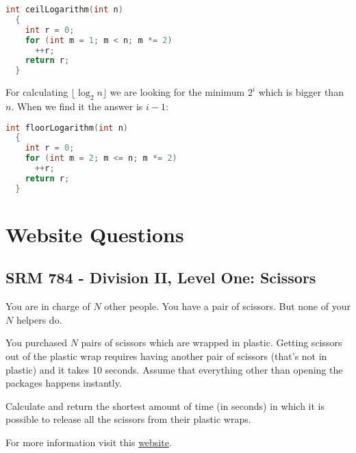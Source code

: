 \documentclass{book}
\begin{document}
	\begin{lstlisting}[language=C++, frame=single]
  int ceilLogarithm(int n)
  {
    int r = 0;    
    for (int m = 1; m < n; m *= 2)
      ++r;
    return r;
  }
	\end{lstlisting}
	For calculating $\lfloor \log_2{n} \rfloor$ we are looking for the minimum $2^i$ which is bigger than $n$. When we find it the answer is $i - 1$:
	\begin{lstlisting}[language=C++, frame=single]
  int floorLogarithm(int n)
  {
    int r = 0;    
    for (int m = 2; m <= n; m *= 2)
      ++r;
    return r;
  }
	\end{lstlisting}
	\section{Website Questions}
	\subsection{SRM 784 - Division II, Level One: Scissors}
	You are in charge of $N$ other people. You have a pair of scissors. But none of your $N$ helpers do. 
	\par You purchased $N$ pairs of scissors which are wrapped in plastic. Getting scissors out of the plastic wrap requires having another pair of scissors (that's not in plastic) and it takes 10 seconds. Assume that everything other than opening the packages happens instantly.
	\par Calculate and return the shortest amount of time (in seconds) in which it is possible to release all the scissors from their plastic wraps.
	\par For more information visit this \href{https://community.topcoder.com/stat?c=problem_statement&pm=16110}{website}.
\end{document}
